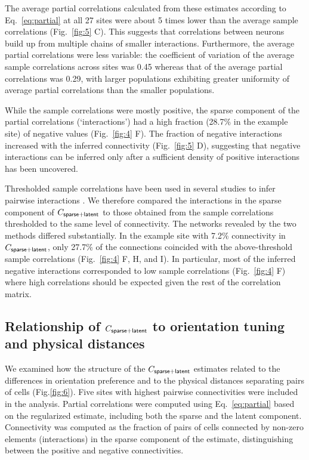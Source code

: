 The average partial correlations calculated from these estimates according to Eq.~\ref{eq:partial} at all 27 sites were about 5 times lower than the average sample correlations (Fig.~\ref{fig:5} C). This suggests that correlations between neurons build up from multiple chains of smaller interactions. Furthermore, the average partial correlations were less variable: the coefficient of variation of the average sample correlations across sites was 0.45 whereas that of the average partial correlations was 0.29, with larger populations exhibiting greater uniformity of average partial correlations than the smaller populations.

While the sample correlations were mostly positive, the sparse component of the partial correlations (`interactions') had a high fraction (28.7\% in the example site) of negative values (Fig.~\ref{fig:4} F). The fraction of negative interactions increased with the inferred connectivity (Fig.~\ref{fig:5} D), suggesting that negative interactions can be inferred only after a sufficient density of positive interactions has been uncovered.

Thresholded sample correlations have been used in several studies to infer pairwise interactions \cite{Golshani:2009, Feldt:2011, Malmersjo:2013, Sadovsky:2014}.  We therefore compared the interactions in the sparse component of $C_{\sf sparse+latent}$ to those obtained from the sample correlations thresholded to the same level of connectivity. The networks revealed by the two methods differed substantially. In the example site with 7.2\% connectivity in $C_{\sf sparse+latent}$, only 27.7\% of the connections coincided with the above-threshold sample correlations (Fig.~\ref{fig:4} F, H, and I). In particular, most of the inferred negative interactions corresponded to low sample correlations (Fig.~\ref{fig:4} F) where high correlations should be expected given the rest of the correlation matrix.

\subsection*{Relationship of $C_{\sf sparse+latent}$ to orientation tuning and physical distances}

We examined how the structure of the $C_{\sf sparse+latent}$ estimates related to the differences in orientation preference and to the physical distances separating pairs of cells (Fig.\;\ref{fig:6}).  Five sites with highest pairwise connectivities were included in the analysis. Partial correlations were computed using Eq.~\ref{eq:partial} based on the regularized estimate, including both the sparse and the latent component. Connectivity was computed as the fraction of pairs of cells connected by non-zero elements (interactions) in the sparse component of the estimate, distinguishing between the positive and negative connectivities.

